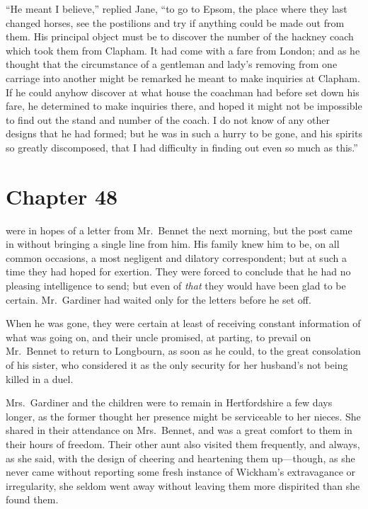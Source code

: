 ``He meant I believe,'' replied Jane, ``to go to Epsom, the place
where they last changed horses, see the postilions and try if
anything could be made out from them.  His principal object
must be to discover the number of the hackney coach which
took them from Clapham.  It had come with a fare from London;
and as he thought that the circumstance of a gentleman and lady's
removing from one carriage into another might be remarked he
meant to make inquiries at Clapham. If he could anyhow discover
at what house the coachman had before set down his fare, he
determined to make inquiries there, and hoped it might not be
impossible to find out the stand and number of the coach.  I do
not know of any other designs that he had formed; but he was in
such a hurry to be gone, and his spirits so greatly discomposed,
that I had difficulty in finding out even so much as this.''



\chapter{Chapter 48}


 were in hopes of a letter from Mr.\ Bennet the
next morning, but the post came in without bringing a single line
from him.  His family knew him to be, on all common occasions,
a most negligent and dilatory correspondent; but at such a time
they had hoped for exertion.  They were forced to conclude that
he had no pleasing intelligence to send; but even of \emph{that} they
would have been glad to be certain.  Mr.\ Gardiner had waited
only for the letters before he set off.

When he was gone, they were certain at least of receiving
constant information of what was going on, and their uncle
promised, at parting, to prevail on Mr.\ Bennet to return to
Longbourn, as soon as he could, to the great consolation of his
sister, who considered it as the only security for her husband's
not being killed in a duel.

Mrs.\ Gardiner and the children were to remain in Hertfordshire
a few days longer, as the former thought her presence might be
serviceable to her nieces.  She shared in their attendance on
Mrs.\ Bennet, and was a great comfort to them in their hours of
freedom.  Their other aunt also visited them frequently, and
always, as she said, with the design of cheering and heartening
them up---though, as she never came without reporting some
fresh instance of Wickham's extravagance or irregularity, she
seldom went away without leaving them more dispirited than
she found them.

